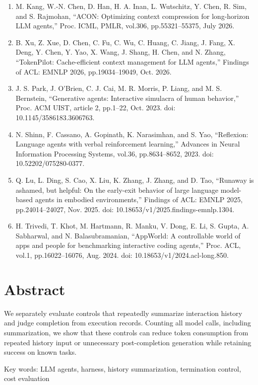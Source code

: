 \documentclass{article}
\begin{document}
\begin{enumerate}
\item M. Kang, W.-N. Chen, D. Han, H. A. Inan, L. Wutschitz, Y. Chen,
R. Sim, and S. Rajmohan,
``ACON: Optimizing context compression for long-horizon LLM agents,''
Proc. ICML, PMLR, vol.306, pp.55321--55375, July 2026.

\item B. Xu, Z. Xue, D. Chen, C. Fu, C. Wu, C. Huang, C. Jiang, J. Fang,
X. Deng, Y. Chen, Y. Yao, X. Wang, J. Shang, H. Chen, and N. Zhang,
``TokenPilot: Cache-efficient context management for LLM agents,''
Findings of ACL: EMNLP 2026, pp.19034--19049, Oct. 2026.

\item J. S. Park, J. O'Brien, C. J. Cai, M. R. Morris, P. Liang, and M. S. Bernstein,
``Generative agents: Interactive simulacra of human behavior,''
Proc. ACM UIST, article 2, pp.1--22, Oct. 2023.
doi: 10.1145/3586183.3606763.

\item N. Shinn, F. Cassano, A. Gopinath, K. Narasimhan, and S. Yao,
``Reflexion: Language agents with verbal reinforcement learning,''
Advances in Neural Information Processing Systems, vol.36, pp.8634--8652, 2023.
doi: 10.52202/075280-0377.

\item Q. Lu, L. Ding, S. Cao, X. Liu, K. Zhang, J. Zhang, and D. Tao,
``Runaway is ashamed, but helpful: On the early-exit behavior of large language model-based agents in embodied environments,''
Findings of ACL: EMNLP 2025, pp.24014--24027, Nov. 2025.
doi: 10.18653/v1/2025.findings-emnlp.1304.

\item H. Trivedi, T. Khot, M. Hartmann, R. Manku, V. Dong, E. Li, S. Gupta,
A. Sabharwal, and N. Balasubramanian,
``AppWorld: A controllable world of apps and people for benchmarking interactive coding agents,''
Proc. ACL, vol.1, pp.16022--16076, Aug. 2024.
doi: 10.18653/v1/2024.acl-long.850.

\end{enumerate}

\section*{Abstract}
We separately evaluate controls that repeatedly summarize interaction history and judge completion from execution records. Counting all model calls, including summarization, we show that these controls can reduce token consumption from repeated history input or unnecessary post-completion generation while retaining success on known tasks.

\noindent Key words: LLM agents, harness, history summarization, termination control, cost evaluation
\end{document}
